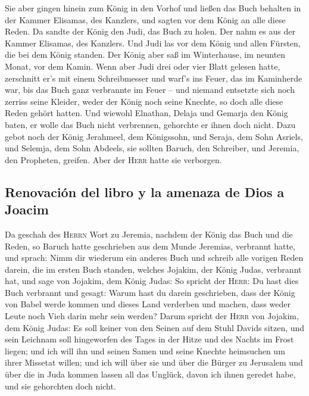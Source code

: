  Sie aber gingen hinein zum König in den Vorhof und
ließen das Buch behalten in der Kammer Elisamas, des Kanzlers, und
sagten vor dem König an alle diese Reden.  Da sandte der
König den Judi, das Buch zu holen. Der nahm es aus der Kammer Elisamas,
des Kanzlers. Und Judi las vor dem König und allen Fürsten, die bei dem
König standen.  Der König aber saß im Winterhause, im
neunten Monat, vor dem Kamin.  Wenn aber Judi drei oder
vier Blatt gelesen hatte, zerschnitt er's mit einem Schreibmesser und
warf's ins Feuer, das im Kaminherde war, bis das Buch ganz verbrannte im
Feuer --  und niemand entsetzte sich noch zerriss seine
Kleider, weder der König noch seine Knechte, so doch alle diese Reden
gehört hatten.  Und wiewohl Elnathan, Delaja und Gemarja
den König baten, er wolle das Buch nicht verbrennen, gehorchte er ihnen
doch nicht.  Dazu gebot noch der König Jerahmeel, dem
Königssohn, und Seraja, dem Sohn Asriels, und Selemja, dem Sohn Abdeels,
sie sollten Baruch, den Schreiber, und Jeremia, den Propheten, greifen.
Aber der \textsc{Herr} hatte sie verborgen.

\hypertarget{renovaciuxf3n-del-libro-y-la-amenaza-de-dios-a-joacim}{%
\subsection{Renovación del libro y la amenaza de Dios a
Joacim}\label{renovaciuxf3n-del-libro-y-la-amenaza-de-dios-a-joacim}}

 Da geschah des \textsc{Herrn} Wort zu Jeremia, nachdem
der König das Buch und die Reden, so Baruch hatte geschrieben aus dem
Munde Jeremias, verbrannt hatte, und sprach:  Nimm dir
wiederum ein anderes Buch und schreib alle vorigen Reden darein, die im
ersten Buch standen, welches Jojakim, der König Judas, verbrannt hat,
 und sage von Jojakim, dem König Judas: So spricht der
\textsc{Herr}: Du hast dies Buch verbrannt und gesagt: Warum hast du
darein geschrieben, dass der König von Babel werde kommen und dieses
Land verderben und machen, dass weder Leute noch Vieh darin mehr sein
werden?  Darum spricht der \textsc{Herr} von Jojakim, dem
König Judas: Es soll keiner von den Seinen auf dem Stuhl Davids sitzen,
und sein Leichnam soll hingeworfen des Tages in der Hitze und des Nachts
im Frost liegen;  und ich will ihn und seinen Samen und
seine Knechte heimsuchen um ihrer Missetat willen; und ich will über sie
und über die Bürger zu Jerusalem und über die in Juda kommen lassen all
das Unglück, davon ich ihnen geredet habe, und sie gehorchten doch
nicht.

